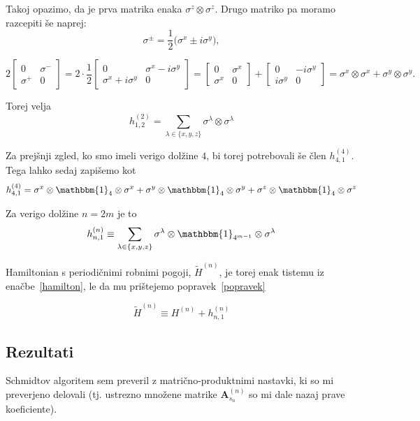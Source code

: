 \documentclass[12pt, a4paper]{article}
\begin{document}
Takoj opazimo, da je prva matrika enaka $\sigma^z \otimes \sigma^z$. Drugo matriko pa moramo
razcepiti \v se naprej:
\[
	\sigma^\pm = \frac{1}{2}\big(\sigma^x \pm i\sigma^y\big),
\]

\[
	2\begin{bmatrix}
		0 & \sigma^- \\
		\sigma^+ & 0
	\end{bmatrix} = 2 \cdot \frac{1}{2} \begin{bmatrix}
		0 & \sigma^x - i\sigma^y \\
		\sigma^x + i\sigma^y & 0
	\end{bmatrix} = \begin{bmatrix}
		0 & \sigma^x \\
		\sigma^x & 0
	\end{bmatrix} + \begin{bmatrix}
		0 & -i\sigma^y \\
		i \sigma^y & 0
	\end{bmatrix} = \sigma^x \otimes \sigma^x + \sigma^y \otimes \sigma^y.
\]

Torej velja
\[
	h^{(2)}_{1,2} = \sum_{\lambda \in \{x,y,z\}} \sigma^\lambda \otimes \sigma^\lambda
\]

Za prej\v snji zgled, ko smo imeli verigo dol\v zine $4$, bi torej potrebovali \v se \v clen
$h^{(4)}_{4,1}$. Tega lahko sedaj zapi\v semo kot
\[
	h^{(4)}_{4,1} = \sigma^x\otimes\mathbbm{1}_4\otimes\sigma^x +
		\sigma^y\otimes\mathbbm{1}_4\otimes\sigma^y +
		\sigma^z\otimes\mathbbm{1}_4\otimes\sigma^z
\]

Za verigo dol\v zine $n = 2m$ je to
\begin{equation}
	h^{(n)}_{n,1} \equiv \sum_{\lambda \in \{x,y,z\}} \sigma^\lambda \otimes
	\mathbbm{1}_{4^{m - 1}} \otimes \sigma^\lambda
	\label{popravek}
\end{equation}

Hamiltonian s periodi\v cnimi robnimi pogoji, $\tilde{H}^{(n)}$, je torej enak tistemu iz
ena\v cbe~\eqref{hamilton}, le da mu pri\v stejemo popravek~\eqref{popravek}

\begin{equation}
	\tilde{H}^{(n)} \equiv H^{(n)} + h^{(n)}_{n,1}
\end{equation}

\subsection{Rezultati}

Schmidtov algoritem sem preveril z matri\v cno-produktnimi nastavki, ki so mi preverjeno delovali
(tj. ustrezno mno\v zene matrike $\mathbf{A}_{s_n}^{(n)}$ so mi dale nazaj prave koeficiente).
\end{document}
